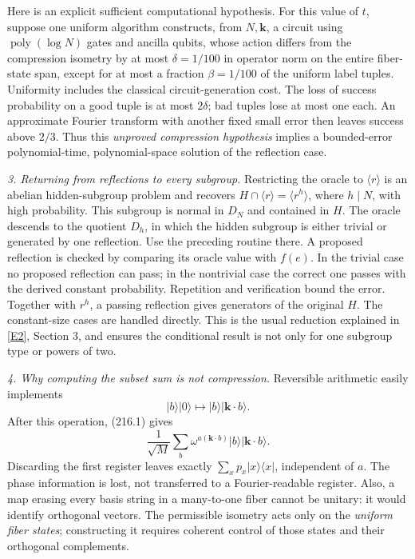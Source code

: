 \documentclass[11pt,a4paper]{article}
\newcommand{\eref}[2]{\hyperlink{extra:#1:#2}{[E#2]}}
\begin{document}
Here is an explicit sufficient computational hypothesis. For this value
of $t$, suppose one uniform algorithm constructs, from $N,\mathbf k$,
a circuit using $\operatorname{poly}(\log N)$ gates and ancilla qubits,
whose action differs from the compression isometry by at most
$\delta=1/100$ in operator norm on the entire fiber-state span, except
for at most a fraction $\beta=1/100$ of the uniform label tuples.
Uniformity includes the classical circuit-generation cost. The loss of
success probability on a good tuple is at most $2\delta$; bad tuples lose
at most one each. An approximate Fourier transform with another fixed
small error then leaves success above $2/3$. Thus this \emph{unproved
compression hypothesis} implies a bounded-error polynomial-time,
polynomial-space solution of the reflection case.

\textit{3. Returning from reflections to every subgroup.}
Restricting the oracle to $\langle r\rangle$ is an abelian hidden-subgroup
problem and recovers $H\cap\langle r\rangle=\langle r^h\rangle$, where
$h\mid N$, with high probability. This subgroup is normal in $D_N$ and
contained in $H$. The oracle descends to the quotient $D_h$, in which
the hidden subgroup is either trivial or generated by one reflection.
Use the preceding routine there. A proposed reflection is checked by
comparing its oracle value with $f(e)$. In the trivial case no proposed
reflection can pass; in the nontrivial case the correct one passes with
the derived constant probability. Repetition and verification bound the
error. Together with $r^h$, a passing reflection gives generators of the
original $H$. The constant-size cases are handled directly. This is the
usual reduction explained in \eref{statement}{2}, Section 3, and ensures the
conditional result is not only for one subgroup type or powers of two.

\textit{4. Why computing the subset sum is not compression.}
Reversible arithmetic easily implements
\[
 |b\rangle|0\rangle\longmapsto|b\rangle|\mathbf k\cdot b\rangle.
\]
After this operation, (216.1) gives
\[
 \frac1{\sqrt M}\sum_b\omega^{a(\mathbf k\cdot b)}
              |b\rangle|\mathbf k\cdot b\rangle.             \tag{216.5}
\]
Discarding the first register leaves exactly
$\sum_xp_x|x\rangle\langle x|$, independent of $a$.
The phase information is lost, not transferred to a Fourier-readable
register. Also, a map erasing every basis string in a many-to-one fiber
cannot be unitary: it would identify orthogonal vectors. The permissible
isometry acts only on the \emph{uniform fiber states}; constructing it
requires coherent control of those states and their orthogonal complements.
\end{document}
